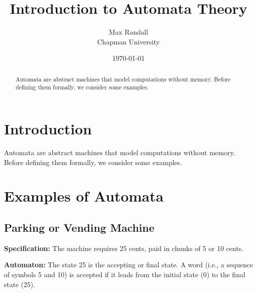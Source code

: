 \documentclass{article}
\title{Introduction to Automata Theory}
\author{Max Randall \\ Chapman University}
\date{\today}
\begin{document}
\maketitle

\begin{abstract}
Automata are abstract machines that model computations without memory. Before defining them formally, we consider some examples.
\end{abstract}

\tableofcontents

\section{Introduction}
Automata are abstract machines that model computations without memory. Before defining them formally, we consider some examples.

\section{Examples of Automata}

\subsection{Parking or Vending Machine}
\textbf{Specification:} The machine requires 25 cents, paid in chunks of 5 or 10 cents.

\textbf{Automaton:} The state 25 is the accepting or final state. A word (i.e., a sequence of symbols 5 and 10) is accepted if it leads from the initial state (0) to the final state (25).

\begin{center}
\end{center}
\end{document}
